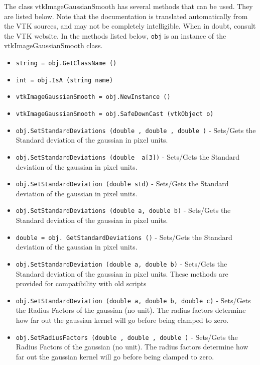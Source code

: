 The class vtkImageGaussianSmooth has several methods that can be used.
  They are listed below.
Note that the documentation is translated automatically from the VTK sources,
and may not be completely intelligible.  When in doubt, consult the VTK website.
In the methods listed below, \verb|obj| is an instance of the vtkImageGaussianSmooth class.
\begin{itemize}
\item  \verb|string = obj.GetClassName ()|

\item  \verb|int = obj.IsA (string name)|

\item  \verb|vtkImageGaussianSmooth = obj.NewInstance ()|

\item  \verb|vtkImageGaussianSmooth = obj.SafeDownCast (vtkObject o)|

\item  \verb|obj.SetStandardDeviations (double , double , double )| -  Sets/Gets the Standard deviation of the gaussian in pixel units.

\item  \verb|obj.SetStandardDeviations (double  a[3])| -  Sets/Gets the Standard deviation of the gaussian in pixel units.

\item  \verb|obj.SetStandardDeviation (double std)| -  Sets/Gets the Standard deviation of the gaussian in pixel units.

\item  \verb|obj.SetStandardDeviations (double a, double b)| -  Sets/Gets the Standard deviation of the gaussian in pixel units.

\item  \verb|double = obj. GetStandardDeviations ()| -  Sets/Gets the Standard deviation of the gaussian in pixel units.

\item  \verb|obj.SetStandardDeviation (double a, double b)| -  Sets/Gets the Standard deviation of the gaussian in pixel units.
 These methods are provided for compatibility with old scripts

\item  \verb|obj.SetStandardDeviation (double a, double b, double c)| -  Sets/Gets the Radius Factors of the gaussian (no unit).
 The radius factors determine how far out the gaussian kernel will 
 go before being clamped to zero.

\item  \verb|obj.SetRadiusFactors (double , double , double )| -  Sets/Gets the Radius Factors of the gaussian (no unit).
 The radius factors determine how far out the gaussian kernel will 
 go before being clamped to zero.


\end{itemize}
